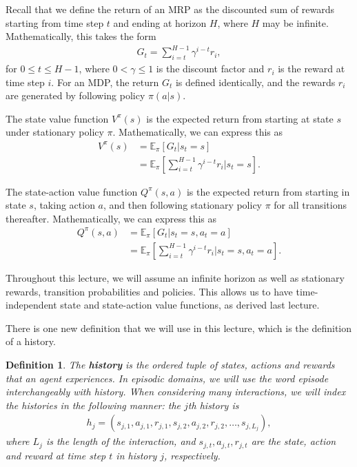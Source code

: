 \documentclass{article}
\newtheorem{definition}{Definition}[section]
\newcommand{\E}{\mathbb{E}}                                        %
\begin{document}
Recall that we define the return of an MRP as the discounted sum of rewards starting from time step $t$ and ending at horizon $H$, where $H$ may be infinite.  Mathematically, this takes the form
\begin{align}
G_t = \sum_{i = t}^{H-1} \gamma^{i - t} r_i,
\end{align}
for $0 \leq t \leq H-1$, where $0 < \gamma \leq 1$ is the discount factor and $r_i$ is the reward at time step $i$.  For an MDP, the return $G_t$ is defined identically, and the rewards $r_i$ are generated by following policy $\pi(a | s)$.

The state value function $V^\pi(s)$ is the expected return from starting at state $s$ under stationary policy $\pi$.  Mathematically, we can express this as
\begin{align}
V^\pi(s) &= \E_{\pi}[G_t  | s_t = s] \\
&= \E_{\pi} \left[ \sum_{i = t}^{H-1} \gamma^{i - t} r_i  | s_t = s \right].
\end{align}

The state-action value function $Q^\pi(s,a)$ is the expected return from starting in state $s$, taking action $a$, and then following stationary policy $\pi$ for all transitions thereafter.  Mathematically, we can express this as
\begin{align}
Q^\pi(s,a) &= \E_{\pi}[G_t  | s_t = s, a_t = a] \\
&= \E_{\pi} \left[ \sum_{i = t}^{H-1} \gamma^{i - t} r_i  | s_t = s, a_t = a \right].
\end{align}

Throughout this lecture, we will assume an infinite horizon as well as stationary rewards, transition probabilities and policies.  This allows us to have time-independent state and state-action value functions, as derived last lecture.

There is one new definition that we will use in this lecture, which is the definition of a history.

\begin{definition} \label{defn:history}
The \textbf{history} is the ordered tuple of states, actions and rewards that an agent experiences.  In episodic domains, we will use the word episode interchangeably with history.  When considering many interactions, we will index the histories in the following manner: the $j$th history is
\begin{align*}
h_j = (s_{j,1}, a_{j,1}, r_{j,1}, s_{j,2}, a_{j,2}, r_{j,2}, \ldots, s_{j,L_j}),
\end{align*}
where $L_j$ is the length of the interaction, and $s_{j,t}, a_{j, t}, r_{j,t}$ are the state, action and reward at time step $t$ in history $j$, respectively.
\end{definition}
\end{document}
